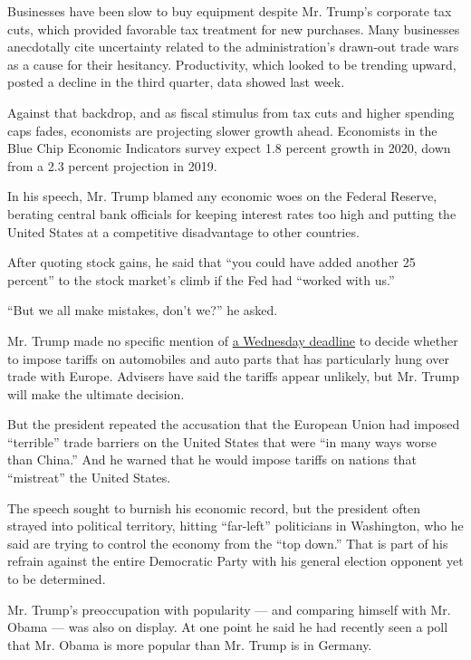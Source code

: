 Businesses have been slow to buy equipment despite Mr. Trump's corporate
tax cuts, which provided favorable tax treatment for new purchases. Many
businesses anecdotally cite uncertainty related to the administration's
drawn-out trade wars as a cause for their hesitancy. Productivity, which
looked to be trending upward, posted a decline in the third quarter,
data showed last week.

Against that backdrop, and as fiscal stimulus from tax cuts and higher
spending caps fades, economists are projecting slower growth ahead.
Economists in the Blue Chip Economic Indicators survey expect 1.8
percent growth in 2020, down from a 2.3 percent projection in 2019.

In his speech, Mr. Trump blamed any economic woes on the Federal
Reserve, berating central bank officials for keeping interest rates too
high and putting the United States at a competitive disadvantage to
other countries.

After quoting stock gains, he said that ``you could have added another
25 percent'' to the stock market's climb if the Fed had ``worked with
us.''

``But we all make mistakes, don't we?'' he asked.

Mr. Trump made no specific mention of
\href{https://www.nytimes.com/2019/11/11/business/trump-auto-tariffs.html}{a
Wednesday deadline} to decide whether to impose tariffs on automobiles
and auto parts that has particularly hung over trade with Europe.
Advisers have said the tariffs appear unlikely, but Mr. Trump will make
the ultimate decision.

But the president repeated the accusation that the European Union had
imposed ``terrible'' trade barriers on the United States that were ``in
many ways worse than China.'' And he warned that he would impose tariffs
on nations that ``mistreat'' the United States.

The speech sought to burnish his economic record, but the president
often strayed into political territory, hitting ``far-left'' politicians
in Washington, who he said are trying to control the economy from the
``top down.'' That is part of his refrain against the entire Democratic
Party with his general election opponent yet to be determined.

Mr. Trump's preoccupation with popularity --- and comparing himself with
Mr. Obama --- was also on display. At one point he said he had recently
seen a poll that Mr. Obama is more popular than Mr. Trump is in Germany.

